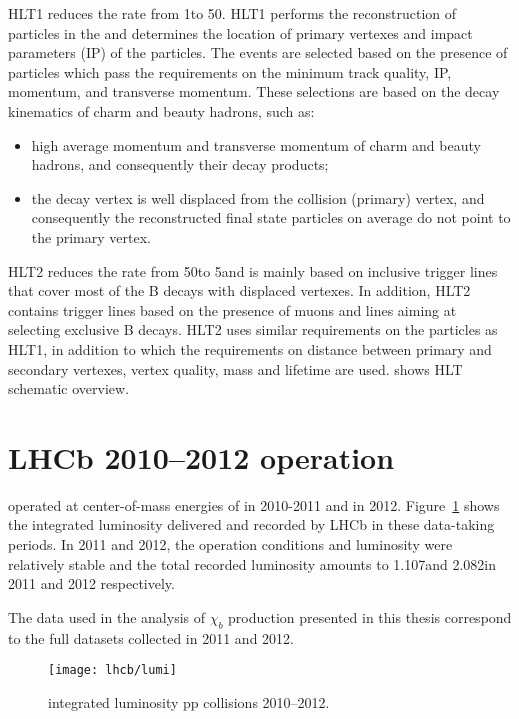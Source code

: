 HLT1 reduces the rate from 1\mhz to 50\khz. HLT1 performs the reconstruction
of particles in the \velo and determines the location of primary vertexes and
impact parameters (IP) of the particles. The events are selected based on the
presence of particles which pass the requirements on the minimum track quality,
IP, momentum, and transverse momentum. These selections are based on the decay
kinematics of charm and beauty hadrons, such as:

\begin{itemize}
\item high average momentum and transverse momentum of charm and beauty
hadrons, and consequently their decay products;
\item the decay vertex is well displaced from the collision (primary) vertex, and
consequently the reconstructed final state particles on average do not point
to the primary vertex.
\end{itemize}

HLT2 reduces the rate from 50\khz to 5\khz and is mainly based on inclusive
trigger lines that cover most of the B decays with displaced vertexes. In
addition, HLT2 contains trigger lines based on the presence of muons and lines
aiming at selecting exclusive B decays. HLT2 uses similar requirements on the
particles as HLT1, in addition to which the requirements on distance between
primary and secondary vertexes, vertex quality, mass and lifetime are used.
 shows HLT schematic overview.



\section{LHCb 2010--2012 operation}

\lhcb operated at center-of-mass energies of \tev in 2010-2011 and 
\tev in 2012. Figure~\ref{fig:lumi} shows the integrated luminosity
delivered and recorded by LHCb in these data-taking periods. In 2011 and 2012,
the operation conditions and luminosity were relatively stable and the total
recorded luminosity amounts to 1.107\invfb and 2.082\invfb in 2011 and 2012
respectively.

The data used in the analysis of $\chi_b$ production presented in this thesis
correspond to the full datasets collected in 2011 and 2012. 

\begin{figure}[tb]
\begin{center}
\texttt{[image: lhcb/lumi]}
\end{center}
\caption{\small \lhcb integrated luminosity pp collisions 2010--2012.}
\label{fig:lumi}
\end{figure}